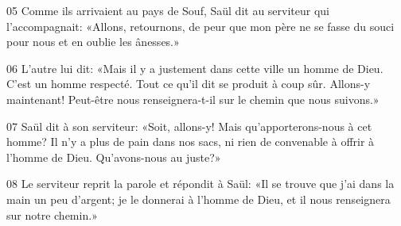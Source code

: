 
05 Comme ils arrivaient au pays de Souf, Saül dit au serviteur qui l’accompagnait: «Allons, retournons, de peur que mon père ne se fasse du souci pour nous et en oublie les ânesses.»

06 L’autre lui dit: «Mais il y a justement dans cette ville un homme de Dieu. C’est un homme respecté. Tout ce qu’il dit se produit à coup sûr. Allons-y maintenant! Peut-être nous renseignera-t-il sur le chemin que nous suivons.»

07 Saül dit à son serviteur: «Soit, allons-y! Mais qu’apporterons-nous à cet homme? Il n’y a plus de pain dans nos sacs, ni rien de convenable à offrir à l’homme de Dieu. Qu’avons-nous au juste?»

08 Le serviteur reprit la parole et répondit à Saül: «Il se trouve que j’ai dans la main un peu d’argent; je le donnerai à l’homme de Dieu, et il nous renseignera sur notre chemin.»
